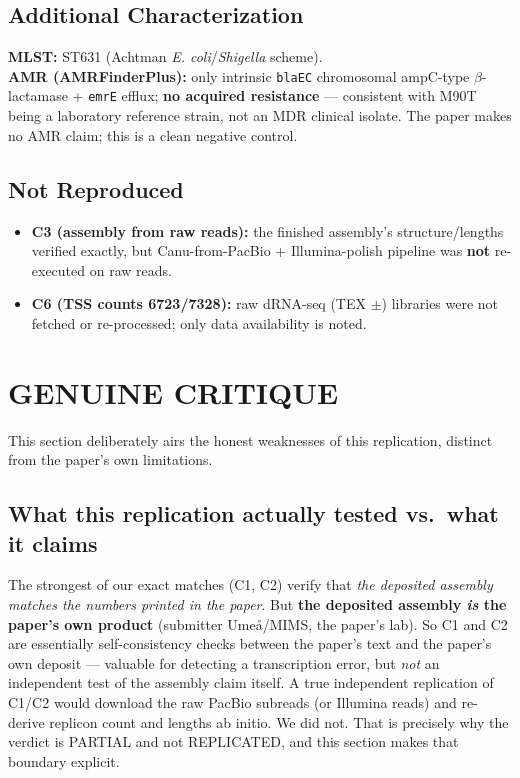 \documentclass[11pt,letterpaper]{article}
\begin{document}
\subsection{Additional Characterization}
\textbf{MLST:} ST631 (Achtman \textit{E. coli}/\textit{Shigella} scheme). \\
\textbf{AMR (AMRFinderPlus):} only intrinsic \texttt{blaEC} chromosomal ampC-type $\beta$-lactamase + \texttt{emrE} efflux; \textbf{no acquired resistance} --- consistent with M90T being a laboratory reference strain, not an MDR clinical isolate. The paper makes no AMR claim; this is a clean negative control.

\subsection{Not Reproduced}
\begin{itemize}[nosep]
  \item \textbf{C3 (assembly from raw reads):} the finished assembly's structure/lengths verified exactly, but Canu-from-PacBio + Illumina-polish pipeline was \textbf{not} re-executed on raw reads.
  \item \textbf{C6 (TSS counts 6723/7328):} raw dRNA-seq (TEX $\pm$) libraries were not fetched or re-processed; only data availability is noted.
\end{itemize}

\section{GENUINE CRITIQUE}

This section deliberately airs the honest weaknesses of this replication, distinct from the paper's own limitations.

\subsection{What this replication actually tested vs.\ what it claims}
The strongest of our exact matches (C1, C2) verify that \emph{the deposited assembly matches the numbers printed in the paper}. But \textbf{the deposited assembly \emph{is} the paper's own product} (submitter Ume\aa{}/MIMS, the paper's lab). So C1 and C2 are essentially self-consistency checks between the paper's text and the paper's own deposit --- valuable for detecting a transcription error, but \emph{not} an independent test of the assembly claim itself. A true independent replication of C1/C2 would download the raw PacBio subreads (or Illumina reads) and re-derive replicon count and lengths ab initio. We did not. That is precisely why the verdict is PARTIAL and not REPLICATED, and this section makes that boundary explicit.
\end{document}
